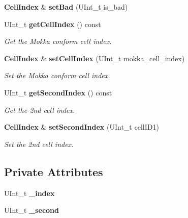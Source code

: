 \begin{DoxyCompactItemize}
\item 
{\bf Cell\-Index} \& {\bfseries set\-Bad} (U\-Int\-\_\-t is\-\_\-bad)\label{classCALICE_1_1CellIndex_aaedafad4a164da776eb9563f6cfecb02}

\item 
U\-Int\-\_\-t {\bf get\-Cell\-Index} () const \label{classCALICE_1_1CellIndex_a8989a0bfe43f87f5ba5d5f665cc8fd60}

\begin{DoxyCompactList}\small\item\em Get the Mokka conform cell index. \end{DoxyCompactList}\item 
{\bf Cell\-Index} \& {\bf set\-Cell\-Index} (U\-Int\-\_\-t mokka\-\_\-cell\-\_\-index)\label{classCALICE_1_1CellIndex_a06927c6c271b586b2d4f2349ad0a0058}

\begin{DoxyCompactList}\small\item\em Set the Mokka conform cell index. \end{DoxyCompactList}\item 
U\-Int\-\_\-t {\bf get\-Second\-Index} () const \label{classCALICE_1_1CellIndex_a62457057612992847f0d1a6791e5eed0}

\begin{DoxyCompactList}\small\item\em Get the 2nd cell index. \end{DoxyCompactList}\item 
{\bf Cell\-Index} \& {\bf set\-Second\-Index} (U\-Int\-\_\-t cell\-I\-D1)\label{classCALICE_1_1CellIndex_acee8e762e051e2e12e0bfab43be8c441}

\begin{DoxyCompactList}\small\item\em Set the 2nd cell index. \end{DoxyCompactList}\end{DoxyCompactItemize}
\subsection*{Private Attributes}
\begin{DoxyCompactItemize}
\item 
U\-Int\-\_\-t {\bfseries \-\_\-index}\label{classCALICE_1_1CellIndex_a0422c3652b611890e2c610eef01fc43e}

\item 
U\-Int\-\_\-t {\bfseries \-\_\-second}\label{classCALICE_1_1CellIndex_adcca7440632d6d8b81aa514a89035b6f}

\end{DoxyCompactItemize}


